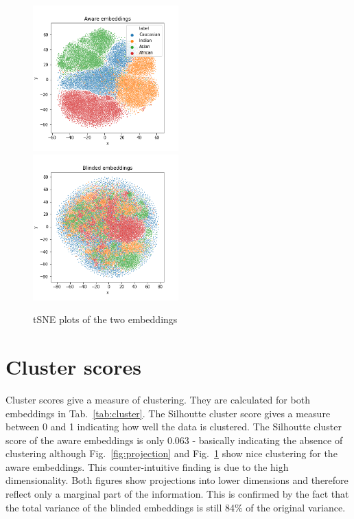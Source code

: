 \documentclass[12pt]{article}
\begin{document}
\begin{figure}
  \includegraphics[width=0.5\textwidth]{t-SNE_aware.png}
  \includegraphics[width=0.5\textwidth]{t-SNE_blinded.png}
  \caption{tSNE plots of the two embeddings}
  \label{fig:tSNE}
\end{figure}


\section{Cluster scores}

Cluster scores give a measure of clustering. They are calculated for both embeddings in Tab.~\ref{tab:cluster}. The Silhoutte cluster score gives a measure between 0 and 1 indicating how well the data is clustered. The Silhoutte cluster score of the aware embeddings is only 0.063 -  basically indicating the absence of clustering although Fig.~\ref{fig:projection} and Fig.~\ref{fig:tSNE} show nice clustering for the aware embeddings. This counter-intuitive finding is due to the high dimensionality. Both figures show projections into lower dimensions and therefore reflect only a marginal part of the information. This is confirmed by the fact that the total variance of the blinded embeddings is still 84\% of the original variance.   
\end{document}
